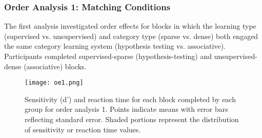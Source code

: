 \documentclass[../dissertation.tex]{subfiles}
\begin{document}
		
\subsubsection{Order Analysis 1: Matching Conditions}
	The first analysis investigated order effects for blocks in which the learning type (supervised vs. unsupervised) and category type (sparse vs. dense) both engaged the same category learning system (hypothesis testing vs. associative). Participants completed supervised-sparse (hypothesis-testing) and unsupervised-dense (associative) blocks.  \par

\begin{wrapfigure}{R}{0.55\textwidth}
\vspace{-10pt}
\texttt{[image: oe1.png]}
\caption[Sensitivity and reaction time for order analysis 1]{Sensitivity (d')  and reaction time for each block completed by each group for order analysis 1. Points indicate means with error bars reflecting standard error. Shaded portions represent the distribution of sensitivity or reaction time values.}
\label{oe1}
\vspace{-20pt}
\end{wrapfigure}		
	
\end{document}
